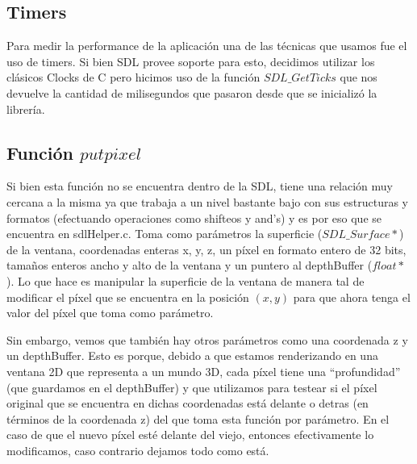 \documentclass[a4paper]{article}
\begin{document}
\subsection{Timers}
Para medir la performance de la aplicación una de las técnicas que usamos fue el uso de timers. Si bien SDL provee soporte para esto, decidimos utilizar los clásicos Clocks de C pero hicimos uso de la función $SDL\_GetTicks$ que nos devuelve la cantidad de milisegundos que pasaron desde que se inicializó la librería.

\subsection{Función $putpixel$} \label{putpixel}
Si bien esta función no se encuentra dentro de la SDL, tiene una relación muy cercana a la misma ya que trabaja a un nivel bastante bajo con sus estructuras y formatos (efectuando operaciones como shifteos y and's) y es por eso que se encuentra en sdlHelper.c.
Toma como parámetros la superficie ($SDL\_Surface*$) de la ventana, coordenadas enteras x, y, z, un píxel en formato entero de 32 bits, tamaños enteros ancho y alto de la ventana y un puntero al depthBuffer ($float*$). Lo que hace es manipular la superficie de la ventana de manera tal de modificar el píxel que se encuentra en la posición $(x, y)$ para que ahora tenga el valor del píxel que toma como parámetro. 
\par Sin embargo, vemos que también hay otros parámetros como una coordenada z y un depthBuffer. Esto es porque, debido a que estamos renderizando en una ventana 2D que representa a un mundo 3D, cada píxel tiene una ``profundidad'' (que guardamos en el depthBuffer) y que utilizamos para testear si el píxel original que se encuentra en dichas coordenadas está delante o detras (en términos de la coordenada z) del que toma esta función por parámetro.
En el caso de que el nuevo píxel esté delante del viejo, entonces efectivamente lo modificamos, caso contrario dejamos
 todo como está.
 
\end{document}
